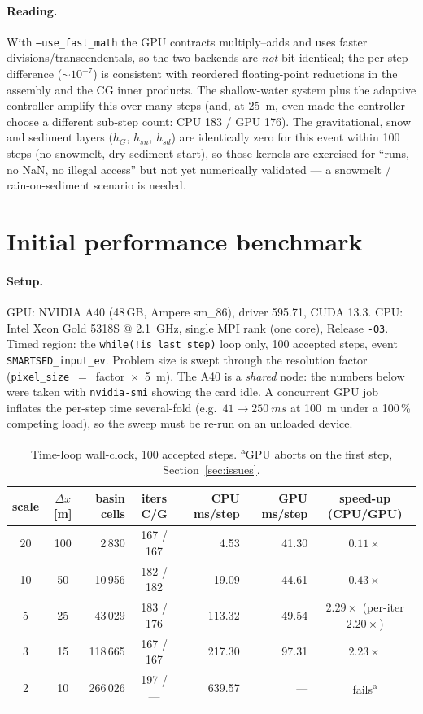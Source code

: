 \documentclass[11pt,a4paper]{article}
\begin{document}
\paragraph{Reading.} With \texttt{--use\_fast\_math} the GPU contracts
multiply--adds and uses faster divisions/transcendentals, so the two backends
are \emph{not} bit-identical; the per-step difference ($\sim\!10^{-7}$) is
consistent with reordered floating-point reductions in the assembly and the CG
inner products. The shallow-water system plus the adaptive controller amplify
this over many steps (and, at \SI{25}{m}, even made the controller choose a
different sub-step count: CPU 183 / GPU 176). The gravitational, snow and
sediment layers ($h_G$, $h_{sn}$, $h_{sd}$) are identically zero for this event
within 100 steps (no snowmelt, dry sediment start), so those kernels are
exercised for ``runs, no NaN, no illegal access'' but not yet numerically
validated --- a snowmelt / rain-on-sediment scenario is needed.

\section{Initial performance benchmark}
\label{sec:bench}

\paragraph{Setup.}
GPU: NVIDIA A40 (48\,GB, Ampere sm\_86), driver 595.71, CUDA 13.3.
CPU: Intel Xeon Gold 5318S @ \SI{2.1}{GHz}, single MPI rank (one core), Release
\texttt{-O3}. Timed region: the \texttt{while(!is\_last\_step)} loop only, 100
accepted steps, event \texttt{SMARTSED\_input\_ev}. Problem size is swept through
the resolution factor (\texttt{pixel\_size}~$=$~factor~$\times$~\SI{5}{m}).
The A40 is a \emph{shared} node: the numbers below were taken with
\texttt{nvidia-smi} showing the card idle. A concurrent GPU job inflates the
per-step time several-fold (e.g.\ $41\to\SI{250}{ms}$ at \SI{100}{m} under a
100\,\% competing load), so the sweep must be re-run on an unloaded device.

\begin{table}[h]
\centering
\small
\begin{tabular}{@{}c c r c r r c@{}}
\toprule
scale & $\Delta x$ [m] & {basin cells} & iters C/G &
{CPU ms/step} & {GPU ms/step} & speed-up (CPU/GPU) \\
\midrule
20 & 100 &   2\,830 & 167 / 167 &   4.53 &  41.30 & $0.11\times$ \\
10 &  50 &  10\,956 & 182 / 182 &  19.09 &  44.61 & $0.43\times$ \\
 5 &  25 &  43\,029 & 183 / 176 & 113.32 &  49.54 & $2.29\times$ \;(per-iter $2.20\times$) \\
 3 &  15 & 118\,665 & 167 / 167 & 217.30 &  97.31 & $2.23\times$ \\
 2 &  10 & 266\,026 & 197 / --- & 639.57 & {---}  & fails\textsuperscript{a} \\
\bottomrule
\end{tabular}
\caption{Time-loop wall-clock, 100 accepted steps. \textsuperscript{a}GPU aborts
on the first step, Section~\ref{sec:issues}.}
\label{tab:speedup}
\end{table}
\end{document}

